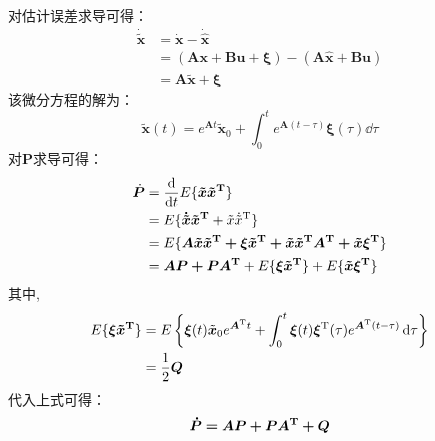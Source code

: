 
对估计误差求导可得：
\begin{align*}
    \dot{\tilde{\bm{x}}} &= \dot{\bm{x}} - \dot{\hat{\bm{x}}} \\
    &= \bm{( Ax+Bu+\xi) - (A\hat{x} + Bu) } \\
    &= \bm{A \tilde{x} + \xi}
\end{align*}
该微分方程的解为：
\begin{equation}
    \bm{\tilde{x}}(t) = e^{\bm{A} t} \tilde{\bm{x}}_0 + \int_0^t{e^{\bm{A} (t-\tau)} \bm{\xi}(\tau)}\dd \tau
\end{equation}
对$\bm{P}$求导可得：
\begin{align*}
    \dot{\bm{P}} &= \frac{\mathop{}\!\mathrm{d}}{\mathop{}\!\mathrm{d} t} E\{\bm{\tilde{x} \tilde{x}^{\mathrm{T}}} \} \\
    &= E\{\bm{\dot{\tilde{x}} \tilde{x}^{\mathrm{T}}} + \tilde{x}\dot{\tilde{x}}^{\mathrm{T}} \} \\
    &= E\{\bm{ A \tilde{x} \tilde{x}^{\mathrm{T}}  + \xi\tilde{x}^{\mathrm{T}} + \tilde{x}\tilde{x}^{\mathrm{T}} A^{\mathrm{T}} + \tilde{x} \xi^{\mathrm{T}}   } \} \\
    &= \bm{A P + P A^{\mathrm{T}}} + E\{ \bm{\xi \tilde{x}^{\mathrm{T}}}\} + E\{ \bm{\tilde{x} \xi^{\mathrm{T}}} \}
\end{align*}
其中,
\begin{align*}
    E \{ \bm{ \xi \tilde{x}^{\mathrm{T}} } \} &= E \left\{ \bm{\xi}(t) \tilde{\bm{x}}_0 e^{\bm{A}^{\mathrm{T}} t} 
    + \int_0^t{ \bm{\xi}(t)\bm{\xi}^{\mathrm{T}} (\tau) e^{\bm{A}^{\mathrm{T}} (t-\tau)} }\mathop{}\!\mathrm{d} \tau \right\} \\
    &= \frac 1 2 \bm{Q}
\end{align*}
代入上式可得：
\begin{equation}
    \bm{\dot{P} = A P + P A^{\mathrm{T}} + Q}
\end{equation}


